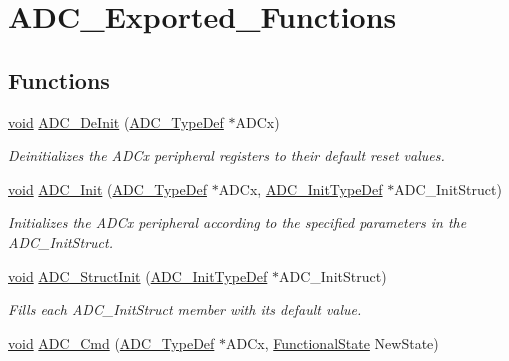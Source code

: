 \hypertarget{group___a_d_c___exported___functions}{}\section{A\+D\+C\+\_\+\+Exported\+\_\+\+Functions}
\label{group___a_d_c___exported___functions}
\subsection*{Functions}
\begin{DoxyCompactItemize}
\item 
\hyperlink{usb__devapi_8h_afabf60e7f57651d6d595a02c75f07cd0}{void} \hyperlink{group___a_d_c___exported___functions_ga31fa6bc09de17125e9db2830ce77c09b}{A\+D\+C\+\_\+\+De\+Init} (\hyperlink{struct_a_d_c___type_def}{A\+D\+C\+\_\+\+Type\+Def} $\ast$A\+D\+Cx)
\begin{DoxyCompactList}\small\item\em Deinitializes the A\+D\+Cx peripheral registers to their default reset values. \end{DoxyCompactList}\item 
\hyperlink{usb__devapi_8h_afabf60e7f57651d6d595a02c75f07cd0}{void} \hyperlink{group___a_d_c___exported___functions_gabbab6038cf8691404350625e477254f9}{A\+D\+C\+\_\+\+Init} (\hyperlink{struct_a_d_c___type_def}{A\+D\+C\+\_\+\+Type\+Def} $\ast$A\+D\+Cx, \hyperlink{struct_a_d_c___init_type_def}{A\+D\+C\+\_\+\+Init\+Type\+Def} $\ast$A\+D\+C\+\_\+\+Init\+Struct)
\begin{DoxyCompactList}\small\item\em Initializes the A\+D\+Cx peripheral according to the specified parameters in the A\+D\+C\+\_\+\+Init\+Struct. \end{DoxyCompactList}\item 
\hyperlink{usb__devapi_8h_afabf60e7f57651d6d595a02c75f07cd0}{void} \hyperlink{group___a_d_c___exported___functions_ga6c6e754d1d0a98d56e465efaf73272ec}{A\+D\+C\+\_\+\+Struct\+Init} (\hyperlink{struct_a_d_c___init_type_def}{A\+D\+C\+\_\+\+Init\+Type\+Def} $\ast$A\+D\+C\+\_\+\+Init\+Struct)
\begin{DoxyCompactList}\small\item\em Fills each A\+D\+C\+\_\+\+Init\+Struct member with its default value. \end{DoxyCompactList}\item 
\hyperlink{usb__devapi_8h_afabf60e7f57651d6d595a02c75f07cd0}{void} \hyperlink{group___a_d_c___exported___functions_ga40882d399e3371755ed610c1134e634e}{A\+D\+C\+\_\+\+Cmd} (\hyperlink{struct_a_d_c___type_def}{A\+D\+C\+\_\+\+Type\+Def} $\ast$A\+D\+Cx, \hyperlink{agilefox_2library_2inc_2stm32f10x__type_8h_ac9a7e9a35d2513ec15c3b537aaa4fba1}{Functional\+State} New\+State)

\end{DoxyCompactItemize}
